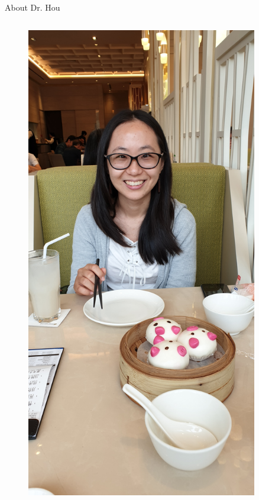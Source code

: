 \documentclass[aspectratio=169]{beamer}
\begin{document}
\begin{frame}{About Dr. Hou}
\begin{columns}[T]
\begin{column}{.5\textwidth}
\begin{figure}
    \includegraphics[width=0.9\textwidth, angle=-90]{fig/Xiaolu.jpg}
\end{figure}
\end{column}%
\end{columns}
\end{frame}
\end{document}
